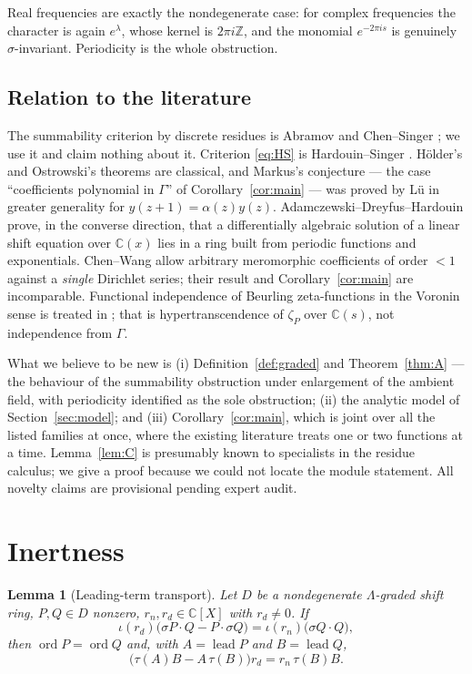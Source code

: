 \documentclass[11pt,a4paper]{amsart}
\theoremstyle{plain}
\newtheorem{lemma}[theorem]{Lemma}
\theoremstyle{definition}
\newcommand{\CC}{\mathbb{C}}
\newcommand{\ZZ}{\mathbb{Z}}
\newcommand{\sig}{\sigma}
\newcommand{\ord}{\operatorname{ord}}
\newcommand{\lead}{\operatorname{lead}}
\begin{document}
Real frequencies are exactly the nondegenerate case: for complex frequencies the character is again
$e^{\lambda}$, whose kernel is $2\pi i\ZZ$, and the monomial $e^{-2\pi is}$ is genuinely
$\sig$-invariant. Periodicity is the whole obstruction.

\subsection{Relation to the literature}
The summability criterion by discrete residues is Abramov \cite{Abramov1971} and Chen--Singer
\cite{ChenSinger2012}; we use it and claim nothing about it. Criterion \eqref{eq:HS} is
Hardouin--Singer \cite{HardouinSinger2008}. H\"older's and Ostrowski's theorems
\cite{Holder1887,Ostrowski1920} are classical, and Markus's conjecture --- the case ``coefficients
polynomial in $\Gamma$'' of Corollary~\ref{cor:main} --- was proved by L\"u \cite{Lu2025} in greater
generality for $y(z+1)=\alpha(z)y(z)$. Adamczewski--Dreyfus--Hardouin \cite{ADHexp2026} prove, in the
converse direction, that a differentially algebraic solution of a linear shift equation over $\CC(x)$
lies in a ring built from periodic functions and exponentials. Chen--Wang \cite{ChenWang2020} allow
arbitrary meromorphic coefficients of order $<1$ against a \emph{single} Dirichlet series; their
result and Corollary~\ref{cor:main} are incomparable. Functional independence of Beurling
zeta-functions in the Voronin sense is treated in \cite{BeurlingIndep2026}; that is hypertranscendence
of $\zeta_P$ over $\CC(s)$, not independence from $\Gamma$.

What we believe to be new is (i) Definition~\ref{def:graded} and Theorem~\ref{thm:A} --- the
behaviour of the summability obstruction under enlargement of the ambient field, with periodicity
identified as the sole obstruction; (ii) the analytic model of Section~\ref{sec:model}; and
(iii) Corollary~\ref{cor:main}, which is joint over all the listed families at once, where the
existing literature treats one or two functions at a time. Lemma~\ref{lem:C} is presumably known to
specialists in the residue calculus; we give a proof because we could not locate the module
statement. All novelty claims are provisional pending expert audit.

\section{Inertness}\label{sec:inert}

\begin{lemma}[Leading-term transport]\label{lem:transport}
Let $D$ be a nondegenerate $\Lambda$-graded shift ring, $P,Q\in D$ nonzero, $r_n,r_d\in\CC[X]$ with
$r_d\neq0$. If
\begin{equation}\label{eq:rel}
  \iota(r_d)\bigl(\sig P\cdot Q-P\cdot\sig Q\bigr)=\iota(r_n)\bigl(\sig Q\cdot Q\bigr),
\end{equation}
then $\ord P=\ord Q$ and, with $A=\lead P$ and $B=\lead Q$,
\[
  \bigl(\tau(A)B-A\,\tau(B)\bigr)r_d=r_n\,\tau(B)B .
\]
\end{lemma}
\end{document}

